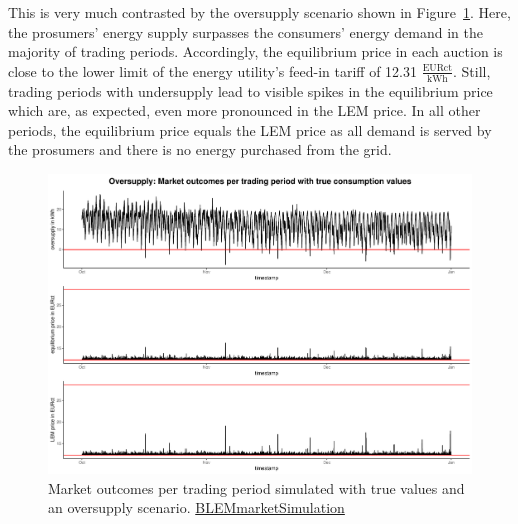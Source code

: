 This is very much contrasted by the oversupply scenario shown in Figure~\ref{Fig:marketoutcomes_true_over}. Here, the prosumers' energy supply surpasses the consumers' energy demand in the majority of trading periods. Accordingly, the equilibrium price in each auction is close to the lower limit of the energy utility's feed-in tariff of 12.31 $\frac{\text{EURct}}{\text{kWh}}$. Still, trading periods with undersupply lead to visible spikes in the equilibrium price which are, as expected, even more pronounced in the LEM price. In all other periods, the equilibrium price equals the LEM price as all demand is served by the prosumers and there is no energy purchased from the grid.
%
\begin{figure}[htp]
    \centering
    \includegraphics[width=\textwidth-1.1cm]{thesis/graphs/marketsimulation/marketoutcome_true_oversupply.pdf}
    \caption[Market outcomes simulated with oversupply and true values]{Market outcomes per trading period simulated with true values and an oversupply scenario. \quantnet\href{https://github.com/QuantLet/BLEM/tree/master/BLEMmarketSimulation}{BLEMmarketSimulation}}
    \label{Fig:marketoutcomes_true_over}
\end{figure}
%


